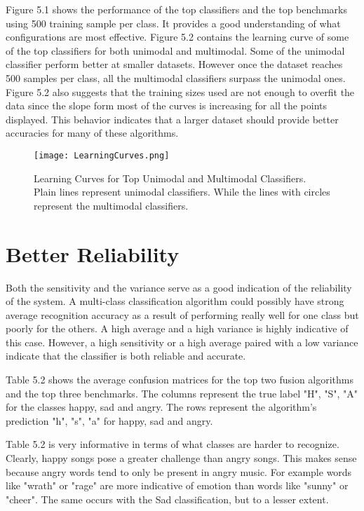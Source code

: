 Figure 5.1 shows the performance of the top classifiers and the top benchmarks using 500 training sample per class. 
It provides a good understanding of what configurations are most effective. Figure 5.2 contains the learning curve of some 
of the top classifiers for both unimodal and multimodal. Some of the unimodal classifier perform better at smaller datasets. However once the 
dataset reaches 500 samples per class,  all the multimodal classifiers surpass the unimodal ones. Figure 5.2 also suggests that the training sizes used are not enough
to overfit the data since the slope form most of the curves is increasing for all the points displayed. This behavior indicates that 
a larger dataset should provide better accuracies for many of these algorithms. 


\begin{figure}
 \centering
 \texttt{[image: LearningCurves.png]} 
 \caption{Learning Curves for Top Unimodal and Multimodal Classifiers. Plain lines represent unimodal classifiers. While the lines with circles represent the multimodal classifiers. }
\end{figure}

\section*{Better Reliability}

Both the sensitivity and the variance serve as a good indication of the reliability of the system.
A multi-class classification algorithm could possibly have strong average 
recognition accuracy as a result of performing really well for one class but 
poorly for the others.  A high average and a high variance is highly indicative of this case. However,
a high sensitivity or a high average paired with a low variance indicate that the classifier is 
both reliable and accurate. 

Table 5.2 shows the average confusion matrices for the top 
two fusion algorithms and the top three benchmarks. The columns represent 
the true label "H", "S", "A" for the classes happy, sad and angry. The rows 
represent the algorithm's prediction "h", "s", "a" for happy, sad and angry.

Table 5.2 is very informative in terms of what classes are harder to recognize. 
Clearly, happy songs pose a greater challenge than angry songs. This makes 
sense because angry words tend to only be present in angry music. For example 
words like "wrath" or "rage" are more indicative of emotion than words like "sunny" or "cheer".
 The same occurs with the Sad classification, but to a lesser extent.
 
